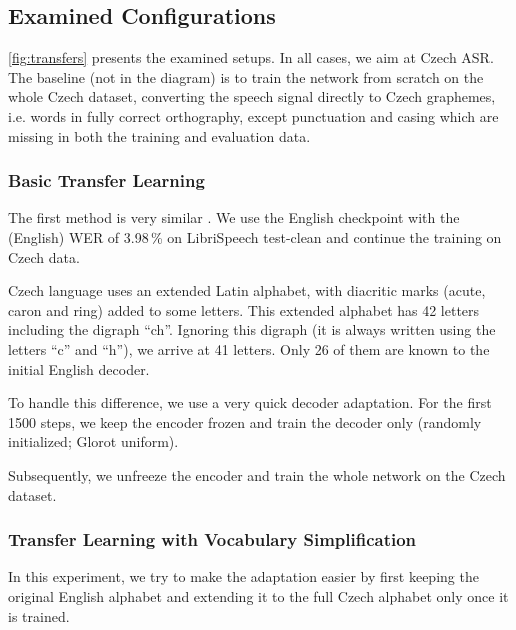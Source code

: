 \subsection{Examined Configurations}
\label{sec:experiments}

\cref{fig:transfers} presents the examined setups. In all cases, we aim at Czech ASR. The baseline (not in the diagram) is to train the network from scratch on the whole Czech dataset, converting the speech signal directly to Czech graphemes, i.e. words in fully correct orthography, except punctuation and casing which are missing in both the training and evaluation data.

\subsubsection{Basic Transfer Learning}
\label{basic_transfer}

The first method is very similar . We use the English checkpoint with the (English) WER of 3.98\,\% on LibriSpeech test-clean and continue the training on Czech data.

Czech language uses an extended Latin alphabet, with diacritic marks (acute, caron and ring) added to some letters. This extended alphabet has 42 letters including the digraph ``ch''. Ignoring this digraph (it is always written using the letters ``c'' and ``h''), we arrive at 41 letters. Only 26 of them are known to the initial English decoder.

To handle this difference, we use a very quick decoder adaptation. For the first 1500 steps, we keep the encoder frozen and train the decoder only (randomly initialized; Glorot uniform).


Subsequently, we unfreeze the encoder and train the whole network on the Czech dataset.

\subsubsection{Transfer Learning with Vocabulary Simplification}

In this experiment, we try to make the adaptation easier by first keeping the original English alphabet and extending it to the full Czech alphabet only once it is trained.

